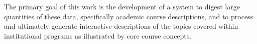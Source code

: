 The primary goal of this work is the development of a system to digest
large quantities of these data, specifically academic course descriptions,
and to process and ultimately generate interactive descriptions of the
topics covered within institutional programs as illustrated by core course
concepts.
